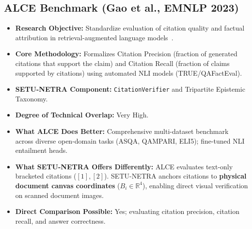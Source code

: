\documentclass[11pt,a4paper]{article}
\begin{document}
\subsection{ALCE Benchmark (Gao et al., EMNLP 2023)}
\begin{itemize}[leftmargin=*]
    \item \textbf{Research Objective:} Standardize evaluation of citation quality and factual attribution in retrieval-augmented language models~\cite{Gao2023ALCE}.
    \item \textbf{Core Methodology:} Formalizes Citation Precision (fraction of generated citations that support the claim) and Citation Recall (fraction of claims supported by citations) using automated NLI models (TRUE/QAFactEval).
    \item \textbf{SETU-NETRA Component:} \texttt{CitationVerifier} and Tripartite Epistemic Taxonomy.
    \item \textbf{Degree of Technical Overlap:} Very High.
    \item \textbf{What ALCE Does Better:} Comprehensive multi-dataset benchmark across diverse open-domain tasks (ASQA, QAMPARI, ELI5); fine-tuned NLI entailment heads.
    \item \textbf{What SETU-NETRA Offers Differently:} ALCE evaluates text-only bracketed citations ($[1], [2]$). SETU-NETRA anchors citations to \textbf{physical document canvas coordinates} ($B_i \in \mathbb{R}^4$), enabling direct visual verification on scanned document images.
    \item \textbf{Direct Comparison Possible:} Yes; evaluating citation precision, citation recall, and answer correctness.
\end{itemize}

\end{document}
